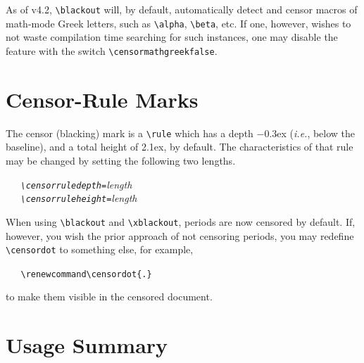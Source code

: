 \documentclass{article}
\begin{document}
As of v4.2, \verb|\blackout| will, by default, automatically 
  detect and censor macros of math-mode Greek letters, such as 
  \verb|\alpha|, \verb|\beta|, etc.
If one, however, wishes to not waste compilation time searching
  for such instances, one may disable the feature with the switch
  \verb|\censormathgreekfalse|.
  

\section{Censor-Rule Marks}

The censor (blacking) mark is a \verb|\rule| which has a depth
  \(-\)0.3ex (\textit{i.e.}, below the baseline), and a total height 
  of 2.1ex, by default.  
The characteristics of that rule may be changed by setting
  the following two lengths.

\itshape
\verb|   \censorruledepth=|length\\
\verb|   \censorruleheight=|length
\upshape

When using \verb|\blackout| and \verb|\xblackout|, periods are 
  now censored by default.
If, however, you wish the prior approach of not censoring periods,
  you may redefine \verb|\censordot| to something else, for example,

\verb|   \renewcommand\censordot{.}|

to make them visible in the censored document.

\section{Usage Summary}
\end{document}
